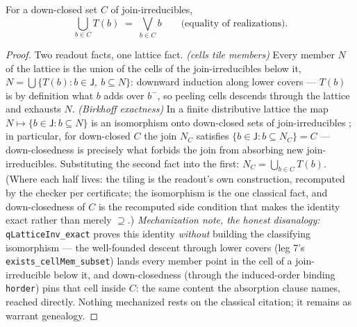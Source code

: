 \begin{bprop}\label{prop:qli-exact}
For a down-closed set $C$ of join-irreducibles,
\[
\bigcup_{b \in C} T(b) \;=\; \bigvee_{b \in C} b
\qquad \text{(equality of realizations).}
\]
\end{bprop}
\begin{proof}
Two readout facts, one lattice fact. \emph{(cells tile members)} Every
member $N$ of the lattice is the union of the cells of the
join-irreducibles below it, $N = \bigcup \{T(b) : b \in \mathsf{J},\
b \subseteq N\}$: downward induction along lower covers --- $T(b)$ is
by definition what $b$ adds over $b^-$, so peeling cells descends
through the lattice and exhausts $N$. \emph{(Birkhoff exactness)} In a
finite distributive lattice the map $N \mapsto \{b \in \mathsf{J} : b
\subseteq N\}$ is an isomorphism onto down-closed sets of
join-irreducibles \cite{birkhoff1937}; in particular, for down-closed
$C$ the join $N_C$ satisfies $\{b \in \mathsf{J} : b \subseteq N_C\} =
C$ --- down-closedness is precisely what forbids the join from
absorbing new join-irreducibles. Substituting the second fact into the
first: $N_C = \bigcup_{b \in C} T(b)$. (Where each half lives: the
tiling is the readout's own construction, recomputed by the checker
per certificate; the isomorphism is the one classical fact, and
down-closedness of $C$ is the recomputed side condition that makes the
identity exact rather than merely $\supseteq$.) \emph{Mechanization
note, the honest disanalogy:} \texttt{qLatticeInv\_exact} proves this
identity \emph{without} building the classifying isomorphism --- the
well-founded descent through lower covers (leg 7's
\texttt{exists\_cellMem\_subset}) lands every member point in the cell
of a join-irreducible below it, and down-closedness (through the
induced-order binding \texttt{horder}) pins that cell inside $C$: the
same content the absorption clause names, reached directly. Nothing
mechanized rests on the classical citation; it remains as warrant
genealogy.
\end{proof}


